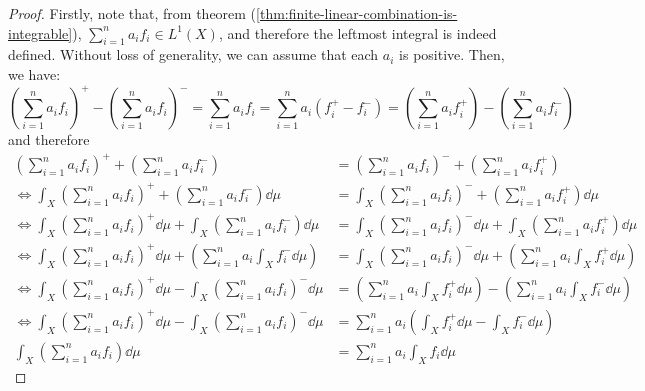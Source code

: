 \documentclass{article}
\newtheorem{theorem}{Theorem}[section]
\theoremstyle{definition}
\theoremstyle{remark}
\theoremstyle{example}
\theoremstyle{notation}
\theoremstyle{axiom}
\begin{document}
\begin{proof}
		Firstly, note that, from theorem (\ref{thm:finite-linear-combination-is-integrable}), $\sum_{i=1}^n a_i f_i \in L^1(X)$, and therefore the leftmost integral is indeed defined. Without loss of generality, we can assume that each $a_i$ is positive. Then, we have:
				$$(\sum_{i=1}^n a_i f_i)^+ - (\sum_{i=1}^n a_i f_i)^- = \sum_{i=1}^n a_i f_i = \sum_{i=1}^n a_i(f_i^+ - f_i^-) = (\sum_{i=1}^n a_i f_i^+) - (\sum_{i=1}^n a_i f_i^-)$$
		and therefore
		\begin{align*}
				(\sum_{i=1}^n a_i f_i)^+ + (\sum_{i=1}^n a_i f_i^-) &= (\sum_{i=1}^n a_i f_i)^- + (\sum_{i=1}^n a_i f_i^+)\\
				\iff \int_X (\sum_{i=1}^n a_i f_i)^+ + (\sum_{i=1}^n a_i f_i^-) \dd \mu &= \int_X (\sum_{i=1}^n a_i f_i)^- + (\sum_{i=1}^n a_i f_i^+) \dd \mu\\
				\iff \int_X (\sum_{i=1}^n a_i f_i)^+ \dd \mu + \int_X (\sum_{i=1}^n a_i f_i^-) \dd \mu &= \int_X (\sum_{i=1}^n a_i f_i)^- \dd \mu + \int_X (\sum_{i=1}^n a_i f_i^+) \dd \mu\\
				\iff \int_X (\sum_{i=1}^n a_i f_i)^+ \dd \mu + (\sum_{i=1}^n a_i \int_X f_i^- \dd \mu) &= \int_X (\sum_{i=1}^n a_i f_i)^- \dd \mu + (\sum_{i=1}^n a_i \int_X f_i^+ \dd \mu)\\
				\iff \int_X (\sum_{i=1}^n a_i f_i)^+ \dd \mu - \int_X (\sum_{i=1}^n a_i f_i)^- \dd \mu &= (\sum_{i=1}^n a_i \int_X f_i^+ \dd \mu) - (\sum_{i=1}^n a_i \int_X f_i^- \dd \mu)\\
				\iff \int_X (\sum_{i=1}^n a_i f_i)^+ \dd \mu - \int_X (\sum_{i=1}^n a_i f_i)^- \dd \mu &= \sum_{i=1}^n a_i(\int_X f_i^+ \dd \mu - \int_X f_i^- \dd \mu)\\
				\int_X (\sum_{i=1}^n a_i f_i) \dd \mu &= \sum_{i=1}^n a_i \int_X f_i \dd \mu
		\end{align*}
\end{proof}



		

\end{document}

